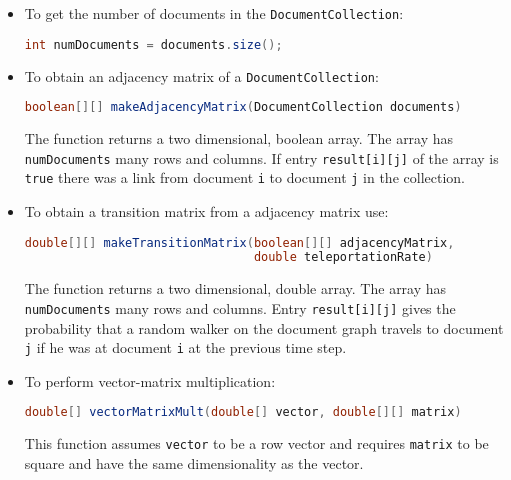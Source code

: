 \documentclass[exam, sectionseven, solution]{acAssignment}
\begin{document}
\begin{itemize}
    \item To get the number of documents in the \texttt{DocumentCollection}:
    
        \begin{lstlisting}[language=Java]
int numDocuments = documents.size();
        \end{lstlisting}
    
    \item To obtain an adjacency matrix of a \texttt{DocumentCollection}:
    
        \begin{lstlisting}[language=Java]
boolean[][] makeAdjacencyMatrix(DocumentCollection documents)
        \end{lstlisting}
        
        The function returns a two dimensional, boolean array.
        The array has \texttt{numDocuments} many rows and columns.
        If entry \texttt{result[i][j]} of the array is \texttt{true} there was a link from document \texttt{i} to document \texttt{j} in the collection.
    
    \item To obtain a transition matrix from a adjacency matrix use:
    
        \begin{lstlisting}[language=Java]
double[][] makeTransitionMatrix(boolean[][] adjacencyMatrix,
                                double teleportationRate)
        \end{lstlisting}
        
        The function returns a two dimensional, double array.
        The array has \texttt{numDocuments} many rows and columns.
        Entry \texttt{result[i][j]} gives the probability that a random walker on the document graph travels to document \texttt{j} if he was at document \texttt{i} at the previous time step.
    
    \item To perform vector-matrix multiplication:
    
        \begin{lstlisting}[language=Java]
double[] vectorMatrixMult(double[] vector, double[][] matrix)
        \end{lstlisting}
        
        This function assumes \texttt{vector} to be a row vector and requires \texttt{matrix} to be square and have the same dimensionality as the vector.
\end{itemize}
\end{document}
